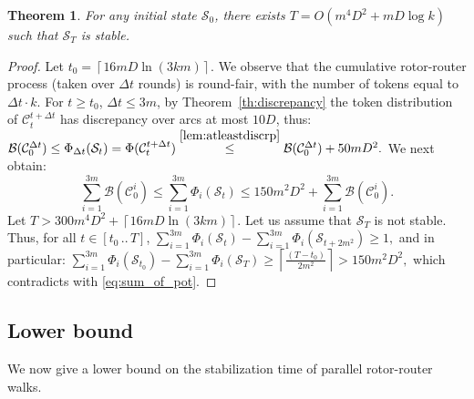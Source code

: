 \documentclass{article}[11pt,letter]
\newtheorem{theorem}[definition]{Theorem}
\newcommand{\state}{\mathcal{S}}
\newcommand{\cload}{\mathcal{C}}
\newcommand{\dt}{\Delta t}
\newcommand{\closedrange}[2]{[#1\,..\,#2]}
\begin{document}
\begin{theorem}
\label{th:stabilizationtime}
For any initial state $\state_0$, there exists $T = O(m^4D^2 + mD\log k)$ such that $\state_T$ is stable.
\end{theorem}
\begin{proof}
Let $t_0 = \left\lceil16mD \ln(3km)\right\rceil$.
We observe that the cumulative rotor-router process (taken over $\dt$ rounds) is round-fair, with the number of tokens equal to $\dt \cdot k$.
For $t \ge t_0$, $\dt \le 3m$, by Theorem~\ref{th:discrepancy} the token distribution  of $\cload_t^{t+\dt}$ has discrepancy over arcs at most $10D$, thus:
$\mathcal{B}( \cload_0^{\dt} ) \le \Phi_{\dt}(\state_t) = \Phi( \cload_t^{t+\dt} ) \stackrel{\eqref{lem:atleastdiscrp}}{\le} \mathcal{B}( \cload_0^{\dt} ) + 50m D^2.$
We next obtain:
\begin{equation}
\label{eq:sum_of_pot}
 \sum_{i=1}^{3m}\mathcal{B}( \cload_0^{i} )  \le \sum_{i=1}^{3m} \Phi_i(\state_t) \le 150m^2 D^2+\sum_{i=1}^{3m}\mathcal{B}( \cload_0^{i} ).
\end{equation}
Let $T > 300m^4D^2 + \left\lceil16mD \ln(3km)\right\rceil$. Let us assume that $\state_{T}$ is not stable. Thus, for all $t \in \closedrange{t_0}{T}$,
$ \sum_{i=1}^{3m} \Phi_{i}(\state_t) - \sum_{i=1}^{3m} \Phi_{i}(\state_{t+2m^2}) \ge 1,$
and in particular:
$\sum_{i=1}^{3m} \Phi_{i}(\state_{t_0}) - \sum_{i=1}^{3m} \Phi_{i}(\state_{T}) \ge \left\lceil\frac{(T-t_0)}{2m^2} \right\rceil > 150m^2D^2,$
which contradicts with \eqref{eq:sum_of_pot}.

\end{proof}

\subsection{Lower bound}

We now give a lower bound on the stabilization time of parallel rotor-router walks.
\end{document}
